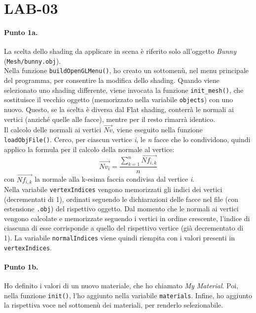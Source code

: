 \documentclass[a4paper, 12pt]{article}
\begin{document}
\section{LAB-03}

\paragraph{Punto 1a.}
La scelta dello shading da applicare in scena è riferito solo all'oggetto \textit{Bunny} (\texttt{Mesh/bunny.obj}).\\
Nella funzione \texttt{buildOpenGLMenu()}, ho creato un sottomenù, nel menu principale del programma, per consentire la modifica dello shading. Quando viene selezionato uno shading differente, viene invocata la funzione \texttt{init\_mesh()}, che sostituisce il vecchio oggetto (memorizzato nella variabile \texttt{objects}) con uno nuovo. Questo, se la scelta è diversa dal Flat shading, conterrà le normali ai vertici (anziché quelle alle facce), mentre per il resto rimarrà identico.\\
Il calcolo delle normali ai vertici $\overrightarrow{Nv}$, viene eseguito nella funzione \texttt{loadObjFile()}. Cerco, per ciascun vertice \textit{i}, le \textit{n} facce che lo condividono, quindi applico la formula per il calcolo della normale al vertice:
\[ \overrightarrow{Nv_i} = \frac{\sum_{k=1}^n \overrightarrow{Nf_{i,k}}}{n} \]
con $\overrightarrow{Nf_{i,k}}$ la normale alla k-esima faccia condivisa dal vertice \textit{i}.\\
Nella variabile \texttt{vertexIndices} vengono memorizzati gli indici dei vertici (decrementati di 1), ordinati seguendo le dichiarazioni delle facce nel file (con estensione \texttt{.obj}) del rispettivo oggetto. Dal momento che le normali ai vertici vengono calcolate e memorizzate seguendo i vertici in ordine crescente, l'indice di ciascuna di esse corrisponde a quello del rispettivo vertice (già decrementato di 1). La variabile \texttt{normalIndices} viene quindi riempita con i valori presenti in \texttt{vertexIndices}.

\paragraph{Punto 1b.}
Ho definito i valori di un nuovo materiale, che ho chiamato \textit{My Material}. Poi, nella funzione \texttt{init()}, l'ho aggiunto nella variabile \texttt{materials}. Infine, ho aggiunto la rispettiva voce nel sottomenù dei materiali, per renderlo selezionabile.
\end{document}
